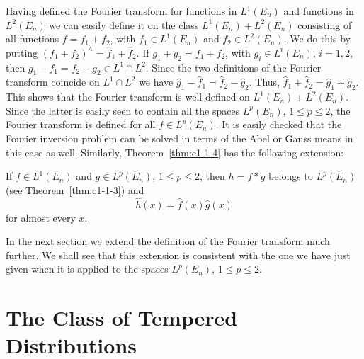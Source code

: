 Having defined the Fourier transform for functions in $L^{1}(E_{n})$ and
functions in $L^{2}(E_{n})$ we can easily define it on the class
$L^{1}(E_{n}) + L^{2}(E_{n})$ consisting of all functions $f = f_{1} + f_{2}$,
with $f_{1} \in L^{1}(E_{n})$ and $f_{2} \in L^{2}(E_{n})$. We do this by
putting $(f_{1} + f_{2})^{\wedge} = \hat{f}_{1} + \hat{f}_{2}$. If
$g_{1} + g_{2} = f_{1} + f_{2}$, with $g_{i} \in L^{i}(E_{n})$, $i = 1, 2$,
then $g_{1} - f_{1} = f_{2} - g_{2} \in L^{1} \cap L^{2}$. Since the two
definitions of the Fourier transform coincide on $L^{1} \cap L^{2}$ we have
$\hat{g}_{1} - \hat{f}_{1} = \hat{f}_{2} - \hat{g}_{2}$. Thus,
$\hat{f}_{1} + \hat{f}_{2} = \hat{g}_{1} + \hat{g}_{2}$. This shows that the
Fourier transform is well-defined on $L^{1}(E_{n}) + L^{2}(E_{n})$. Since the
latter is easily seen to contain all the spaces $L^{p}(E_{n})$,
$1 \leq p \leq 2$, the Fourier transform is defined for all
$f \in L^{p}(E_{n})$. It is easily checked that the Fourier inversion problem
can be solved in terms of the Abel or Gauss means in this case as well.
Similarly, Theorem~\ref{thm:c1-1-4} has the following extension:

\begin{theorem}\label{thm:c1-2-6}
If $f \in L^{1}(E_{n})$ and $g \in L^{p}(E_{n})$, $1 \leq p \leq 2$, then
$h = f * g$ belongs to $L^{p}(E_{n})$ (see Theorem~\ref{thm:c1-1-3}) and
\[
\hat{h}(x)=\hat{f}(x)\hat{g}(x)
\]
for almost every $x$.
\end{theorem}

In the next section we extend the definition of the Fourier transform much
further. We shall see that this extension is consistent with the one we have
just given when it is applied to the spaces $L^{p}(E_{n})$, $1 \leq p \leq 2$.

\section{The Class of Tempered Distributions}

